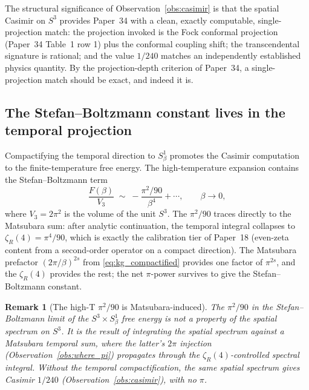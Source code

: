 \documentclass[11pt]{article}
\newtheorem{remark}{Remark}
\begin{document}
The structural significance of Observation~\ref{obs:casimir} is that the
spatial Casimir on $S^3$ provides Paper~34 with a clean, exactly
computable, single-projection match: the projection invoked is the Fock
conformal projection (Paper~34 Table~1 row 1) plus the conformal
coupling shift; the transcendental signature is rational; and the value
$1/240$ matches an independently established physics quantity.  By the
projection-depth criterion of Paper~34, a single-projection match
should be exact, and indeed it is.

\subsection{The Stefan--Boltzmann constant lives in the temporal projection}

Compactifying the temporal direction to $S^1_\beta$ promotes the
Casimir computation to the finite-temperature free energy.  The
high-temperature expansion contains the Stefan--Boltzmann term
\begin{equation}
\label{eq:sb}
\frac{F(\beta)}{V_3} \;\sim\; -\frac{\pi^2/90}{\beta^4} + \cdots,
\qquad \beta \to 0,
\end{equation}
where $V_3 = 2\pi^2$ is the volume of the unit $S^3$.  The
$\pi^2/90$ traces directly to the Matsubara sum: after analytic
continuation, the temporal integral collapses to $\zeta_R(4) = \pi^4 /
90$, which is exactly the calibration tier of Paper~18 (even-zeta
content from a second-order operator on a compact direction).  The
Matsubara prefactor $(2\pi/\beta)^{2s}$ from \eqref{eq:kg_compactified}
provides one factor of $\pi^{2s}$, and the $\zeta_R(4)$ provides the
rest; the net $\pi$-power survives to give the Stefan--Boltzmann
constant.

\begin{remark}[The high-T $\pi^2/90$ is Matsubara-induced]
\label{rem:sb_provenance}
The $\pi^2/90$ in the Stefan--Boltzmann limit of the $S^3 \times
S^1_\beta$ free energy is not a property of the spatial spectrum on
$S^3$.  It is the result of integrating the spatial spectrum against
a Matsubara temporal sum, where the latter's $2\pi$ injection
(Observation~\ref{obs:where_pi}) propagates through the
$\zeta_R(4)$-controlled spectral integral.  Without the temporal
compactification, the same spatial spectrum gives Casimir $1/240$
(Observation~\ref{obs:casimir}), with no $\pi$.
\end{remark}

\end{document}
